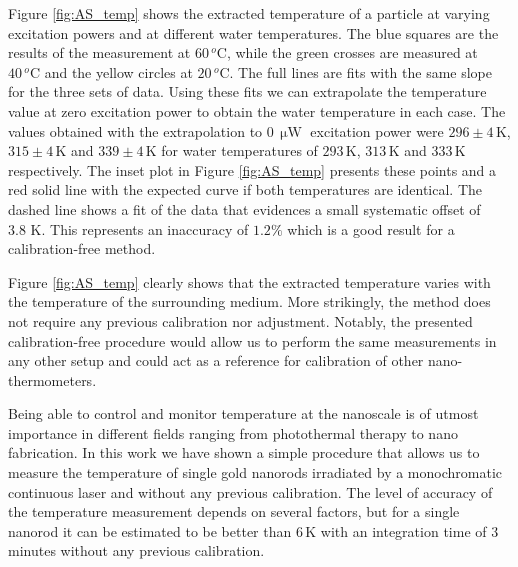 \documentclass[journal=nalefd,manuscript=letter]{achemso}
\newcommand{\HI}[1]{{#1}} %
\newcommand{\K}{\ensuremath{\,\textrm{K}}}
\newcommand{\uW}{\ensuremath{\,\upmu\textrm{W}}}
\newcommand{\degree}{\ensuremath{\,^o\textrm{C}}}
\begin{document}
Figure \ref{fig:AS_temp} shows the extracted temperature of a particle at
varying excitation powers and at different water temperatures. The blue squares
are the results of the measurement at $60\degree$, while the green crosses are measured
at $40\degree$ and the yellow circles at $20\degree$. The full lines are \HI{fits 
with the same slope for the three sets of data. Using these fits we can extrapolate
the temperature value at zero excitation power to obtain the water temperature in each case.}
The values obtained with the extrapolation to $0\uW$ excitation power were $296 \pm 4\K$, $315\pm 4\K$
and $339 \pm 4\K$ for water temperatures of $293\K$, $313\K$ and $333\K$
respectively. The inset plot in Figure \ref{fig:AS_temp} presents these points 
and a red solid line with the expected curve if both temperatures are identical. The 
dashed line shows a fit of the data that evidences a small systematic offset of $3.8\,\K$. This represents
an inaccuracy of $1.2\%$ which is a good result for a calibration-free method.

Figure \ref{fig:AS_temp} clearly shows that the extracted temperature varies
with the temperature of the surrounding medium. More strikingly, the method does
not require any previous calibration nor adjustment. 
Notably, the presented calibration-free procedure would allow us to perform the same
measurements in any other setup and could act as a reference for calibration of
other nano-thermometers.


Being able to control and monitor temperature at the nanoscale is of utmost
importance in different fields ranging from photothermal therapy\cite{Huang2006}
to nano fabrication\cite{Fedoruk2013}. In this work we have shown a simple
procedure that allows us to measure the temperature of single gold nanorods
irradiated by a monochromatic continuous laser and without any previous
calibration. The level of accuracy of the temperature measurement depends on
several factors, but for \HI{a single} nanorod it can be estimated to be better than $6\K$ 
with an integration time of $3$ minutes without any previous calibration.
\end{document}
